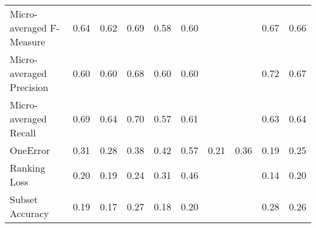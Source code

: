 \begin{tabular}{l|rrrrrrrrr}
Micro-averaged F-Measure & 0.64 & 0.62 & 0.69 & 0.58 & 0.60 &  &  & 0.67 & 0.66 \\

Micro-averaged Precision & 0.60 & 0.60 & 0.68 & 0.60 & 0.60 &  &  & 0.72 & 0.67 \\

Micro-averaged Recall & 0.69 & 0.64 & 0.70 & 0.57 & 0.61 &  &  & 0.63 & 0.64 \\

OneError & 0.31 & 0.28 & 0.38 & 0.42 & 0.57 & 0.21 & 0.36 & 0.19 & 0.25 \\

Ranking Loss & 0.20 & 0.19 & 0.24 & 0.31 & 0.46 &  &  & 0.14 & 0.20 \\

Subset Accuracy & 0.19 & 0.17 & 0.27 & 0.18 & 0.20 &  &  & 0.28 & 0.26 \\

\end{tabular}
